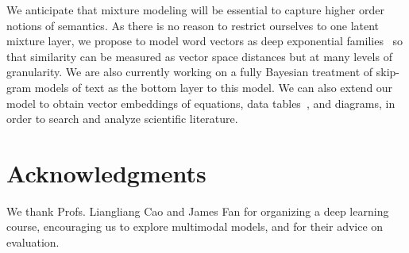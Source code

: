 \documentclass[11pt]{article}
\begin{document}
We anticipate that mixture modeling will be essential to capture higher order notions of semantics. As there is no reason to restrict ourselves to one latent mixture layer, we propose to model word vectors as deep exponential families~\cite{Ranganath14b} so that similarity can be measured as vector space distances but at many levels of granularity. We are also currently working on a fully Bayesian treatment of skip-gram models of text as the bottom layer to this model. We can also extend our model to obtain vector embeddings of equations, data tables~\cite{Pinto03}, and diagrams, in order to search and analyze scientific literature.

\section*{Acknowledgments}

We thank Profs. Liangliang Cao and James Fan for organizing a deep learning course, encouraging us to explore multimodal models, and for their advice on evaluation.




\end{document}
